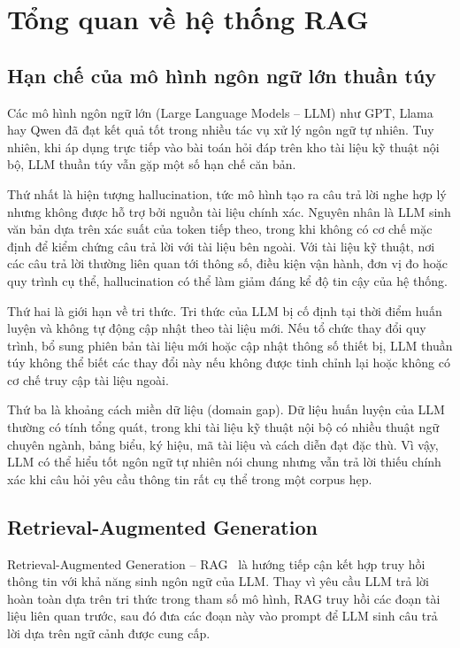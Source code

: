 \documentclass[../DoAn.tex]{subfiles}
\begin{document}
\section{Tổng quan về hệ thống RAG}
\label{section:2.1}

\subsection{Hạn chế của mô hình ngôn ngữ lớn thuần túy}
\label{subsection:2.1.1}

Các mô hình ngôn ngữ lớn (Large Language Models -- LLM) như GPT, Llama hay Qwen đã đạt kết quả tốt trong nhiều tác vụ xử lý ngôn ngữ tự nhiên. Tuy nhiên, khi áp dụng trực tiếp vào bài toán hỏi đáp trên kho tài liệu kỹ thuật nội bộ, LLM thuần túy vẫn gặp một số hạn chế căn bản.

Thứ nhất là hiện tượng hallucination, tức mô hình tạo ra câu trả lời nghe hợp lý nhưng không được hỗ trợ bởi nguồn tài liệu chính xác. Nguyên nhân là LLM sinh văn bản dựa trên xác suất của token tiếp theo, trong khi không có cơ chế mặc định để kiểm chứng câu trả lời với tài liệu bên ngoài. Với tài liệu kỹ thuật, nơi các câu trả lời thường liên quan tới thông số, điều kiện vận hành, đơn vị đo hoặc quy trình cụ thể, hallucination có thể làm giảm đáng kể độ tin cậy của hệ thống.

Thứ hai là giới hạn về tri thức. Tri thức của LLM bị cố định tại thời điểm huấn luyện và không tự động cập nhật theo tài liệu mới. Nếu tổ chức thay đổi quy trình, bổ sung phiên bản tài liệu mới hoặc cập nhật thông số thiết bị, LLM thuần túy không thể biết các thay đổi này nếu không được tinh chỉnh lại hoặc không có cơ chế truy cập tài liệu ngoài.

Thứ ba là khoảng cách miền dữ liệu (domain gap). Dữ liệu huấn luyện của LLM thường có tính tổng quát, trong khi tài liệu kỹ thuật nội bộ có nhiều thuật ngữ chuyên ngành, bảng biểu, ký hiệu, mã tài liệu và cách diễn đạt đặc thù. Vì vậy, LLM có thể hiểu tốt ngôn ngữ tự nhiên nói chung nhưng vẫn trả lời thiếu chính xác khi câu hỏi yêu cầu thông tin rất cụ thể trong một corpus hẹp.

\subsection{Retrieval-Augmented Generation}
\label{subsection:2.1.2}

Retrieval-Augmented Generation -- RAG~\cite{lewis2020rag} là hướng tiếp cận kết hợp truy hồi thông tin với khả năng sinh ngôn ngữ của LLM. Thay vì yêu cầu LLM trả lời hoàn toàn dựa trên tri thức trong tham số mô hình, RAG truy hồi các đoạn tài liệu liên quan trước, sau đó đưa các đoạn này vào prompt để LLM sinh câu trả lời dựa trên ngữ cảnh được cung cấp.
\end{document}
